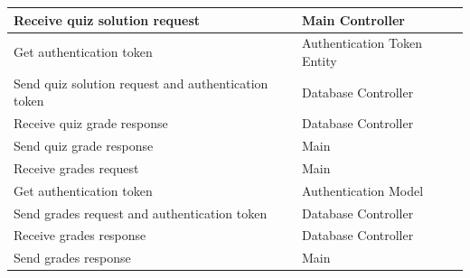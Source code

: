 \documentclass[]{article}
\begin{document}
\begin{enumerate}[a)]
\begin{table}[ht]
\begin{tabular}{|p{5cm}|p{5cm}|}
		\hline
		Receive quiz solution request & Main Controller \\
		\hline
		Get authentication token & Authentication Token Entity \\
		\hline
		Send quiz solution request and authentication token & Database Controller \\
		\hline
		Receive quiz grade response & Database Controller \\
		\hline
		Send quiz grade response & Main \\
		\hline
		Receive grades request & Main \\
		\hline
		Get authentication token & Authentication Model \\
		\hline
		Send grades request and authentication token & Database Controller \\
		\hline
		Receive grades response & Database Controller \\
		\hline
		Send grades response & Main \\
		\hline
		\end{tabular}
	\end{table}



\end{enumerate}
\end{document}
